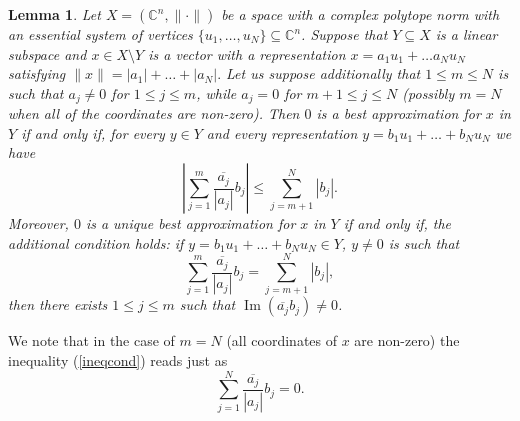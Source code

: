 \documentclass[12pt, reqno]{amsart}
\newtheorem{lem}[twr]{Lemma}
\theoremstyle{definition}
\theoremstyle{remark}
\numberwithin{equation}{section}
\DeclareMathOperator{\im}{Im}
\begin{document}
\begin{lem}
\label{lemchar}
Let $X = (\mathbb{C}^n, \| \cdot \|)$ be a space with a complex polytope norm with an essential system of vertices $\{ u_1, \ldots, u_N \} \subseteq \mathbb{C}^n$. Suppose that $Y \subseteq X$ is a linear subspace and $x \in X \setminus Y$ is a vector with a representation $x = a_1u_1 + \ldots a_Nu_N$ satisfying $\|x\|=|a_1| + \ldots + |a_N|.$ Let us suppose additionally that $1 \leq m \leq N$ is such that $a_j \neq 0$ for $1 \leq j \leq m$, while $a_j=0$ for $m+1 \leq j \leq N$ (possibly $m=N$ when all of the coordinates are non-zero). Then $0$ is a best approximation for $x$ in $Y$ if and only if, for every $y \in Y$ and every representation $y=b_1u_1 + \ldots + b_Nu_N$ we have
\begin{equation}
\label{ineqcond}
\left | \sum_{j=1}^{m} \frac{\overline{a_j}}{|a_j|} b_j \right | \leq \sum_{j=m+1}^{N} |b_j|.
\end{equation}
Moreover, $0$ is a unique best approximation for $x$ in $Y$ if and only if, the additional condition holds: if $y=b_1u_1 + \ldots + b_Nu_N \in Y$, $y \neq 0$ is such that
$$ \sum_{j=1}^{m} \frac{\overline{a_j}}{|a_j|} b_j = \sum_{j=m+1}^{N} |b_j|,$$
then there exists $1 \leq j \leq m$ such that $\im(\overline{a_j}b_j) \neq 0$.

\end{lem}

We note that in the case of $m=N$ (all coordinates of $x$ are non-zero) the inequality (\ref{ineqcond}) reads just as
$$\sum_{j=1}^{N} \frac{\overline{a_j}}{|a_j|} b_j = 0 .$$
\end{document}
